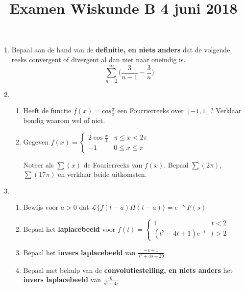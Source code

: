 \documentclass{article}
\begin{document}
\title{Examen Wiskunde B 4 juni 2018}

\date{}
\author{}
\maketitle

\begin{enumerate}

 \item  {
            Bepaal aan de hand van de \textbf{definitie, en niets anders} dat de volgende reeks convergent of divergent al dan niet naar oneindig is. 
            $$\sum_{n = 2}^{\infty} \bigg(\frac{3}{n - 1} - \frac{3}{n}\bigg)$$
        }
        
 \item  {
            \begin{enumerate}
                \item Heeft de functie $f(x) = cos \frac{\pi}{x}$ een Fourrierreeks over $[-1, 1]$? Verklaar bondig waarom wel of niet.
                \item Gegeven $f(x) = \begin{cases}
                             2\cos \frac{x}{4}  & \pi \leq x < 2\pi \\
                             -1                 & 0 \leq x \leq \pi
                            \end{cases}$
                   
                   
                   Noteer als $\sum(x)$ de Fourierreeks van $f(x)$. Bepaal $\sum(2\pi)$, $\sum(17\pi)$ en verklaar beide uitkomsten.
            \end{enumerate}
        }
        
 \item \begin{enumerate}
        \item Bewijs voor $a > 0$ dat $\mathcal{L}\{f(t - a)H(t - a)\} = e^{-as}F(s)$
        \item Bepaal het \textbf{laplacebeeld} voor $f(t) =  \begin{cases}
                                                        1 & t < 2 \\
                                                        (t^2 - 4t + 1)e^{-t} & t > 2
                                                    \end{cases}$
        \item Bepaal het \textbf{invers laplacebeeld} van $\displaystyle\frac{-s + 1}{s^2 + 4s + 29}$ 
        \item Bepaal met behulp van de \textbf{convolutiestelling, en niets anders} het \textbf{invers laplacebeeld} van $\displaystyle \frac{6}{s^3 + 4s}$
       \end{enumerate}


\end{enumerate}
\end{document}
